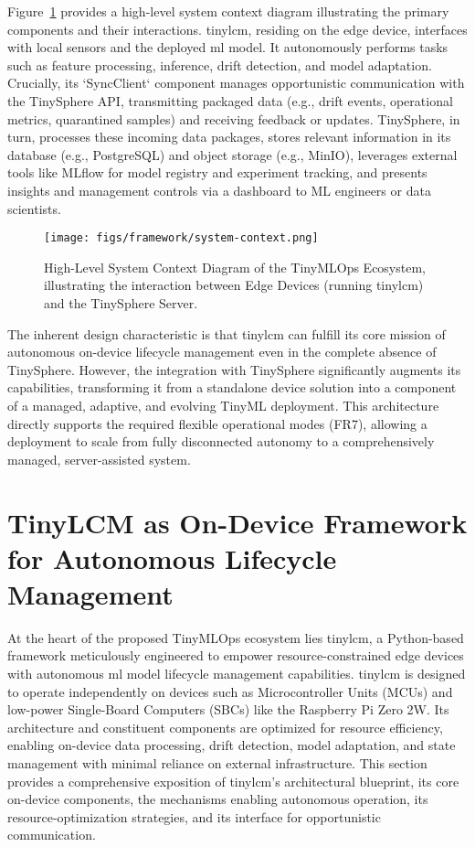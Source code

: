 Figure~\ref{fig:ecosystem_context_diagram} provides a high-level system context diagram illustrating the primary components and their interactions. \gls{tinylcm}, residing on the edge device, interfaces with local sensors and the deployed \gls{ml} model. It autonomously performs tasks such as feature processing, inference, drift detection, and model adaptation. Crucially, its `SyncClient` component manages opportunistic communication with the TinySphere API, transmitting packaged data (e.g., drift events, operational metrics, quarantined samples) and receiving feedback or updates. TinySphere, in turn, processes these incoming data packages, stores relevant information in its database (e.g., PostgreSQL) and object storage (e.g., MinIO), leverages external tools like MLflow for model registry and experiment tracking, and presents insights and management controls via a dashboard to ML engineers or data scientists.

\begin{figure}[htbp]
    \centering
    \texttt{[image: figs/framework/system-context.png]}
    \caption[High-Level System Context Diagram of the TinyMLOps Ecosystem]{High-Level System Context Diagram of the TinyMLOps Ecosystem, illustrating the interaction between Edge Devices (running \gls{tinylcm}) and the TinySphere Server.}
    \label{fig:ecosystem_context_diagram}
\end{figure}

The inherent design characteristic is that \gls{tinylcm} can fulfill its core mission of autonomous on-device lifecycle management even in the complete absence of TinySphere. However, the integration with TinySphere significantly augments its capabilities, transforming it from a standalone device solution into a component of a managed, adaptive, and evolving TinyML deployment. This architecture directly supports the required flexible operational modes (FR7), allowing a deployment to scale from fully disconnected autonomy to a comprehensively managed, server-assisted system.


\section{TinyLCM as On-Device Framework for Autonomous Lifecycle Management}
\label{sec:tinylcm_detailed_design}

At the heart of the proposed TinyMLOps ecosystem lies \gls{tinylcm}, a Python-based framework meticulously engineered to empower resource-constrained edge devices with autonomous \gls{ml} model lifecycle management capabilities. \gls{tinylcm} is designed to operate independently on devices such as Microcontroller Units (MCUs) and low-power Single-Board Computers (SBCs) like the Raspberry Pi Zero 2W. Its architecture and constituent components are optimized for resource efficiency, enabling on-device data processing, drift detection, model adaptation, and state management with minimal reliance on external infrastructure. This section provides a comprehensive exposition of \gls{tinylcm}'s architectural blueprint, its core on-device components, the mechanisms enabling autonomous operation, its resource-optimization strategies, and its interface for opportunistic communication.

